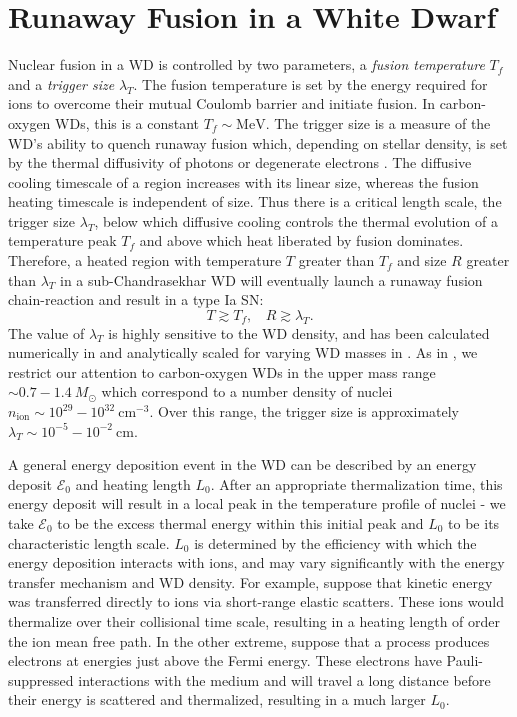\documentclass[twocolumn,showpacs,preprintnumbers,amsmath,amssymb,prd]{revtex4}
\newcommand{\MeV}{\text{MeV}}
\newcommand{\cm}{\text{cm}}
\begin{document}
\section{Runaway Fusion in a White Dwarf}
\label{sec:Review}

Nuclear fusion in a WD is controlled by two parameters, a \emph{fusion temperature} $T_f$ and a \emph{trigger size} $\lambda_T$.
The fusion temperature is set by the energy required for ions to overcome their mutual Coulomb barrier and initiate fusion.
In carbon-oxygen WDs, this is a constant $T_f \sim \MeV$.
The trigger size is a measure of the WD's ability to quench runaway fusion which, depending on stellar density, is set by the thermal diffusivity of photons or degenerate electrons \cite{Woosley}.
The diffusive cooling timescale of a region increases with its linear size, whereas the fusion heating timescale is independent of size.
Thus there is a critical length scale, the trigger size $\lambda_T$, below which diffusive cooling controls the thermal evolution of a temperature peak $T_f$ and above which heat liberated by fusion dominates.
Therefore, a heated region with temperature $T$ greater than $T_f$ and size $R$ greater than $\lambda_T$ in a sub-Chandrasekhar WD will eventually launch a runaway fusion chain-reaction and result in a type Ia SN:
\begin{equation}
\label{eq:runaway}
  T \gtrsim T_f, ~~~~ R \gtrsim \lambda_T.
\end{equation}
The value of $\lambda_T$ is highly sensitive to the WD density, and has been calculated numerically in \cite{Woosley} and analytically scaled for varying WD masses in \cite{Graham:2015apa}.
As in \cite{Graham:2015apa}, we restrict our attention to carbon-oxygen WDs in the upper mass range $\sim 0.7 - 1.4 ~M_{\odot}$ which correspond to a number density of nuclei $n_\text{ion} \sim 10^{29} - 10^{32} ~\cm^{-3}$.
Over this range, the trigger size is approximately $\lambda_T \sim 10^{-5} - 10^{-2} ~\text{cm}$.

A general energy deposition event in the WD can be described by an energy deposit $\mathcal{E}_0$ and heating length $L_0$.
After an appropriate thermalization time, this energy deposit will result in a local peak in the temperature profile of nuclei - we take $\mathcal{E}_0$ to be the excess thermal energy within this initial peak and $L_0$ to be its characteristic length scale.
$L_0$ is determined by the efficiency with which the energy deposition interacts with ions, and may vary significantly with the energy transfer mechanism and WD density.
For example, suppose that kinetic energy was transferred directly to ions via short-range elastic scatters.
These ions would thermalize over their collisional time scale, resulting in a heating length of order the ion mean free path.
In the other extreme, suppose that a process produces electrons at energies just above the Fermi energy.
These electrons have Pauli-suppressed interactions with the medium and will travel a long distance before their energy is scattered and thermalized, resulting in a much larger $L_0$.
\end{document}
